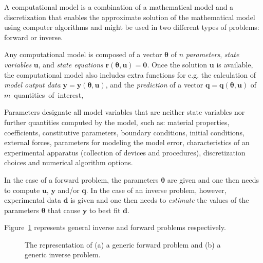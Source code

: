 A computational model is a combination of a
mathematical model and a discretization that enables the approximate
solution of the mathematical model using computer algorithms and  might be used in two different types of problems:
forward or inverse. 

Any computational model is composed of a vector $\boldsymbol{\theta}$ of $n$ {\it parameters}, {\it state variables} $\mathbf{u}$, and {\it state equations} $\mathbf{r}(\boldsymbol{\theta},\mathbf{u}) = \mathbf{0}$.
Once the solution $\mathbf{u}$ is available, the computational model also includes extra functions for e.g.
the calculation of {\it model output data} $\mathbf{y} = \mathbf{y}(\boldsymbol{\theta},\mathbf{u})$, and the {\it prediction} of a
vector $\mathbf{q} = \mathbf{q}(\boldsymbol{\theta},\mathbf{u})$ of $m$~quantities~of~interest,

Parameters designate all model variables that are neither state variables
nor further quantities computed by the model, such as: material properties, coefficients, constitutive parameters, boundary conditions, initial conditions,
external forces, parameters for modeling the model error, characteristics of an experimental apparatus (collection of devices and procedures),
discretization choices and numerical algorithm options.



In the case of a forward problem, the parameters $\boldsymbol{\theta}$ are given and
one then needs to compute $\mathbf{u}$, $\mathbf{y}$ and/or $\mathbf{q}$.
In the case of an inverse problem, however, experimental data $\mathbf{d}$ is given and
one then needs to {\it estimate} the values of the parameters $\boldsymbol{\theta}$ that
cause $\mathbf{y}$ to best fit  $\mathbf{d}$.


Figure~\ref{fig-generic-problems} represents general inverse and forward problems respectively.
\begin{figure}[htbp]
\vspace{-10pt}
\begin{center}
\quad\quad
{}
\end{center}
\vspace{-20pt}
\caption{The representation of (a) a generic forward problem and (b) a generic inverse problem.}
\label{fig-generic-problems}
\end{figure}



